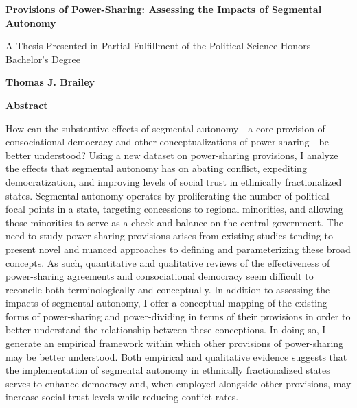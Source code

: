 \documentclass[12pt]{article}
\begin{document}
\begin{titlepage}

\begin{center}
\vspace{1cm}
\LARGE
\textbf{Provisions of Power-Sharing: Assessing the Impacts of Segmental Autonomy}

\large
\vspace{.5cm}

A Thesis Presented in Partial Fulfillment of the Political Science Honors Bachelor's Degree\\

\vspace{.5cm}

\textbf{Thomas J. Brailey}\\

\vspace{.5cm}
\Large
\vspace{.5cm}
\Large

\textbf{Abstract}
\end{center}

How can the substantive effects of segmental autonomy---a core provision of consociational democracy and other conceptualizations of power-sharing---be better understood? Using a new dataset on power-sharing provisions, I analyze the effects that segmental autonomy has on abating conflict, expediting democratization, and improving levels of social trust in ethnically fractionalized states. Segmental autonomy operates by proliferating the number of political focal points in a state, targeting concessions to regional minorities, and allowing those minorities to serve as a check and balance on the central government. The need to study power-sharing provisions arises from existing studies tending to present novel and nuanced approaches to defining and parameterizing these broad concepts. As such, quantitative and qualitative reviews of the effectiveness of power-sharing agreements and consociational democracy seem difficult to reconcile both terminologically and conceptually. In addition to assessing the impacts of segmental autonomy, I offer a conceptual mapping of the existing forms of power-sharing and power-dividing in terms of their provisions in order to better understand the relationship between these conceptions. In doing so, I generate an empirical framework within which other provisions of power-sharing may be better understood. Both empirical and qualitative evidence suggests that the implementation of segmental autonomy in ethnically fractionalized states serves to enhance democracy and, when employed alongside other provisions, may increase social trust levels while reducing conflict rates. 


\end{titlepage}
\end{document}
